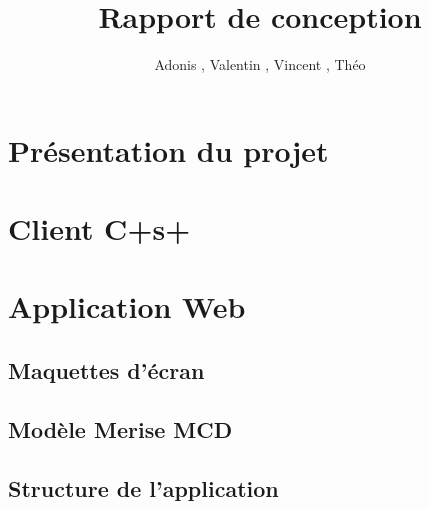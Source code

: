 \documentclass{report}
\title{Rapport de conception}
\author{Adonis \bsc{Najimi}, Valentin \bsc{Stern}, Vincent \bsc{Albert}, Théo \bsc{Gerriet}}
\begin{document}
\section{Présentation du projet}
\section{Client C+s+}
\section{Application Web}
\subsection{Maquettes d'écran}
\subsection{Modèle Merise MCD}
\subsection{Structure de l'application}
\end{document}
